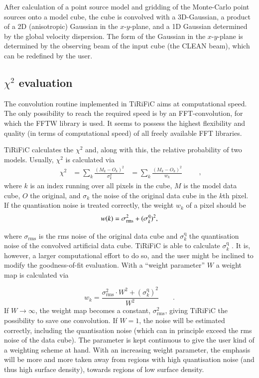 \documentclass[oldversion]{aa}
\newcommand{\cng}[1]{{#1}}
\begin{document}
After calculation of a point source model and gridding of the
Monte-Carlo point sources on\cng{to} a model cube, the cube is convolved with a 3D-Gaussian,
a product of a 2D (anisotropic) Gaussian in the $x$-$y$-plane, and a 1D
Gaussian determined by the global velocity dispersion.  The form of the
Gaussian in the $x$-$y$-plane is determined by the \cng{observing} beam of
the input cube \cng{(the CLEAN beam)}, which can be redefined by the user.
\subsection{$\chi^2$ evaluation} \label{Sect_2.2.3} The convolution
routine implemented in TiRiFiC \cng{aims} at computational speed. 
The only possibility to reach the required speed is by an
FFT-convolution, for which the FFTW \citep[][]{Frigo05} library is used. 
It seems to possess the highest flexibility and quality (in terms of
computational speed) of all freely available FFT libraries. 

TiRiFiC calculates the $\chi^2$ and, along with this, the relative
probability of two models.  Usually, $\chi^2$ is calculated via
%
\begin{equation}
\label{eq_2.1}
\begin{aligned}
\chi^2 & = \sum_k \frac{(M_k-O_k)^2}{\sigma_k^2} & = \sum_k
\frac{(M_k-O_k)^2}{w_k}
\end{aligned}
\qquad,
\end{equation}
%
where $k$ is an index running over all pixels in the cube, $M$ is
the model data cube, $O$ the original, and $\sigma_k$ the noise of
the original data cube in the $k$th pixel.  If the quantisation noise is
treated correctly, the weight $w_k$ of a pixel should be
\label{eq_2.6}
\begin{equation}
w(k) = \sigma_{\mathrm{rms}}^2+(\sigma^{\mathrm{q}}_k)^2 \rm ,
\end{equation}

where $\sigma_{\mathrm{rms}}$ is the rms noise of the original data cube
and $\sigma^{\mathrm{q}}_k$ the quantisation noise of the convolved
artificial data cube.  TiRiFiC is able to calculate
$\sigma^{\mathrm{q}}_k$ \citep[for a mathematical treatment
see][]{Jozsa06}.  It is, however, a larger computational effort to do
so, and the user might be inclined to modify the goodness-of-fit
evaluation.  With a ``weight parameter'' $W$ a weight map is calculated
via

\begin{equation}
\label{eq_2.7}
w_k = \frac{\sigma_{\mathrm{rms}}^2\cdot W^2+(\sigma^{\mathrm{q}}_k)^2}{W^2} \qquad .
\end{equation}
If $W \rightarrow \infty$, the weight map becomes a
constant, $\sigma_{\mathrm{rms}}^2$, giving TiRiFiC the possibility to save one
convolution. If $W=1$, the noise will be estimated correctly,
including the quantisation noise (which can in principle exceed the rms
noise of the data cube). The parameter is kept continuous to give the
user kind of a weighting scheme at hand. With an increasing weight
parameter, the emphasis will be more and more taken away from regions
with high quantisation noise (and thus high surface density)\cng{,} towards regions
of low surface density.
\end{document}
